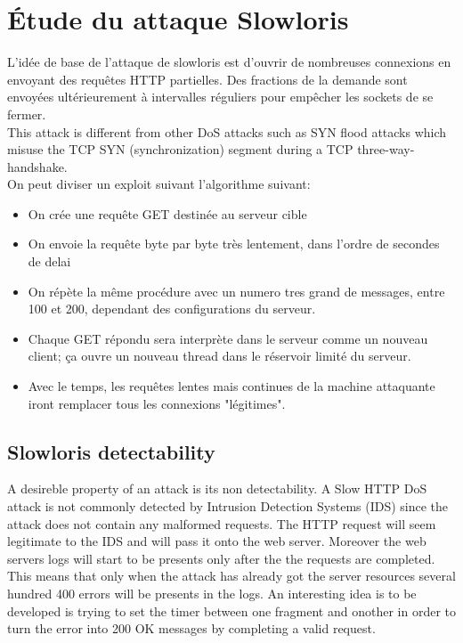 \documentclass{article}
\begin{document}
\section{Étude du attaque Slowloris}
L'idée de base de l'attaque de slowloris est d'ouvrir de nombreuses connexions en envoyant des requêtes HTTP partielles. Des fractions de la demande sont envoyées ultérieurement à intervalles réguliers pour empêcher les sockets de se fermer. \\
This attack is different from other DoS attacks such as SYN flood attacks which misuse the TCP SYN (synchronization) segment during a TCP three-way-handshake. \\
On peut diviser un exploit suivant l'algorithme suivant: \\
\begin{itemize}
	\item On crée une requête GET destinée au serveur cible
	\item On envoie la requête byte par byte très lentement, dans l'ordre de secondes de delai
	\item On répète la même procédure avec un numero tres grand de messages, entre 100 et 200, dependant des configurations du serveur.
	\item Chaque GET répondu sera interprète dans le serveur comme un nouveau client; ça ouvre un nouveau thread dans le réservoir limité du serveur.
	\item Avec le temps, les requêtes lentes mais continues de la machine attaquante iront remplacer tous les connexions "légitimes".
\end{itemize}

\subsection{Slowloris detectability}
A desireble property of an attack is its non detectability. A Slow HTTP DoS attack is not commonly detected by Intrusion Detection Systems (IDS) since the attack does not contain any malformed requests. The HTTP request will seem legitimate to the IDS and will pass it onto the web server. Moreover the web servers logs will start to be presents only after the the requests are completed. This means that only when the attack has already got the server resources several hundred 400 errors will be presents in the logs. An interesting idea is to be developed is trying to set the timer between one fragment and onother in order to turn the error into 200 OK messages by completing a valid request.
\end{document}
